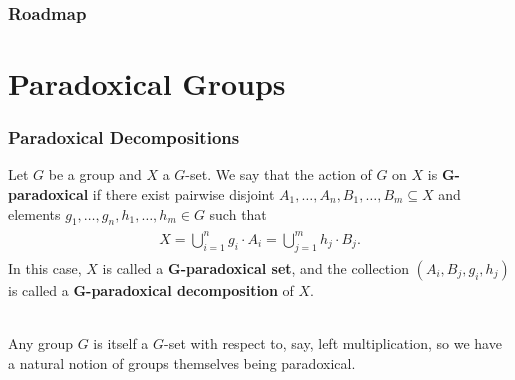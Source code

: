 \documentclass{beamer}
\begin{document}
\begin{frame}
\frametitle{Roadmap}
\begin{center}
\begin{minipage}{\widthof{(4) Representation Theory:\ Categorified}}
\setlength{\parskip}{4ex}
\tableofcontents
\end{minipage}
\end{center}
\end{frame}


\section{Paradoxical Groups}

\begin{frame}
\frametitle{Paradoxical Decompositions}
\begin{definition}
Let $G$ be a group and $X$ a $G$-set. We say that the action of $G$ on $X$ is \textbf{$\boldsymbol{G}$-paradoxical} if there exist pairwise disjoint $A_1, \dots, A_n, B_1, \dots, B_m \subseteq X$ and elements $g_1, \dots, g_n, h_1, \dots, h_m \in G$ such that\\[-1.5\baselineskip]
\begin{align*}
\begin{split}
X = \bigcup_{i=1}^n g_i \cdot A_i = \bigcup_{j=1}^m h_j \cdot B_j.
\end{split}
\end{align*}
In this case, $X$ is called a \textbf{$\boldsymbol{G}$-paradoxical set}, and the collection $(A_i, B_j, g_i, h_j)$ is called a \textbf{$\boldsymbol{G}$-paradoxical decomposition} of $X$.
\end{definition}

\noindent\\[0.5\baselineskip] Any group $G$ is itself a $G$-set with respect to, say, left multiplication, so we have a natural notion of groups themselves being paradoxical.\\[\baselineskip]


\end{frame}
\end{document}
